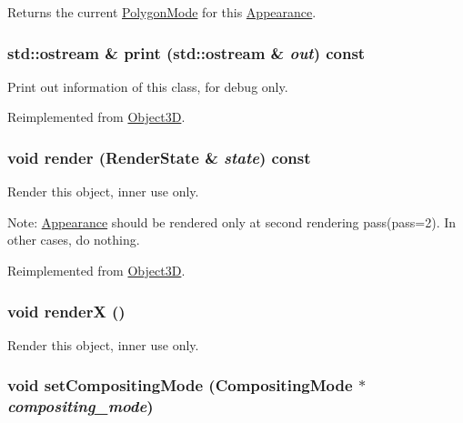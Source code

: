Returns the current \hyperlink{classm3g_1_1PolygonMode}{PolygonMode} for this \hyperlink{classm3g_1_1Appearance}{Appearance}. \hypertarget{classm3g_1_1Appearance_6fea17fa1532df3794f8cb39cb4f911f}{
\subsubsection[{print}]{\setlength{\rightskip}{0pt plus 5cm}std::ostream \& print (std::ostream \& {\em out}) const}}
\label{classm3g_1_1Appearance_6fea17fa1532df3794f8cb39cb4f911f}


Print out information of this class, for debug only. 

Reimplemented from \hyperlink{classm3g_1_1Object3D_6fea17fa1532df3794f8cb39cb4f911f}{Object3D}.\hypertarget{classm3g_1_1Appearance_8babc8a79b78615da51161e94029eea9}{
\subsubsection[{render}]{\setlength{\rightskip}{0pt plus 5cm}void render ({\bf RenderState} \& {\em state}) const}}
\label{classm3g_1_1Appearance_8babc8a79b78615da51161e94029eea9}


Render this object, inner use only.

Note: \hyperlink{classm3g_1_1Appearance}{Appearance} should be rendered only at second rendering pass(pass=2). In other cases, do nothing. 

Reimplemented from \hyperlink{classm3g_1_1Object3D_8babc8a79b78615da51161e94029eea9}{Object3D}.\hypertarget{classm3g_1_1Appearance_443a7a301f77f625335ecc06d13bad06}{
\subsubsection[{renderX}]{\setlength{\rightskip}{0pt plus 5cm}void renderX ()}}
\label{classm3g_1_1Appearance_443a7a301f77f625335ecc06d13bad06}


Render this object, inner use only. \hypertarget{classm3g_1_1Appearance_8f9514f1c01268fff95b7c31f3a194b6}{
\subsubsection[{setCompositingMode}]{\setlength{\rightskip}{0pt plus 5cm}void setCompositingMode ({\bf CompositingMode} $\ast$ {\em compositing\_\-mode})}}
\label{classm3g_1_1Appearance_8f9514f1c01268fff95b7c31f3a194b6}


